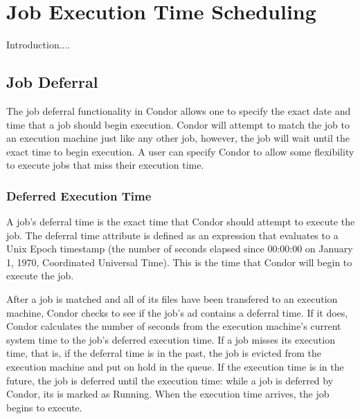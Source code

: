 \section{Job Execution Time Scheduling}
\label{sec:job-executetime-scheduling}

Introduction....

\subsection{Job Deferral}
\label{sec:jobdeferral}

The job deferral functionality in Condor allows one to specify the exact date and time that a job should begin execution. Condor will attempt to match the job to an execution machine just like any other job, however, the job will wait until the exact time to begin execution. A user can specify Condor to allow some flexibility to execute jobs that miss their execution time.

\subsubsection{Deferred Execution Time}
\label{sec:jobdeferral-deferraltime}
A job's deferral time is the exact time that Condor should attempt to execute the job. The deferral time attribute is defined as an expression that evaluates to a Unix Epoch timestamp (the number of seconds elapsed since 00:00:00 on January 1, 1970, Coordinated Universal Time). This is the time that Condor will begin to execute the job.

After a job is matched and all of its files have been transfered to an execution machine, Condor checks to see if the job's ad contains a deferral time. If it does, Condor calculates the number of seconds from the execution machine's current system time to the job's deferred execution time. If a job misses its execution time, that is, if the deferral time is in the past, the job is evicted from the execution machine and put on hold in the queue. If the execution time is in the future, the job is deferred until the execution time: while a job is deferred by Condor, its  is marked as Running. When the execution time arrives, the job begins to execute.

